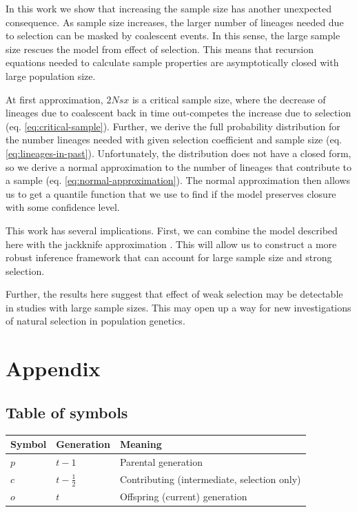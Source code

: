\documentclass[review]{elsarticle}
\begin{document}
In this work we show that increasing the sample size has another unexpected consequence. As sample
size increases, the larger number of lineages needed due to selection can be masked by coalescent
events. In this sense, the large sample size rescues the model from effect of selection. This means
that recursion equations needed to calculate sample properties are asymptotically closed with large
population size.

At first approximation, $2Nsx$ is a critical sample size, where the decrease of lineages due to
coalescent back in time out-competes the increase due to selection (eq. \eqref{eq:critical-sample}).
Further, we derive the full probability distribution for the number lineages needed with given
selection coefficient and sample size (eq. \eqref{eq:lineages-in-past}). Unfortunately, the
distribution does not have a closed form, so we derive a normal approximation to the number of
lineages that contribute to a sample (eq. \eqref{eq:normal-approximation}). The normal approximation
then allows us to get a quantile function that we use to find if the model preserves closure with
some confidence level.

This work has several implications. First, we can combine the model described here with the
jackknife approximation \citep{JouganousEtAl2017}. This will allow us to construct a more robust
inference framework that can account for large sample size and strong selection.

Further, the results here suggest that effect of weak selection may be detectable in studies with
large sample sizes. This may open up a way for new investigations of natural selection in population
genetics.



\section{Appendix}
\subsection{Table of symbols}

\label{ssec:tab-symbols}
\begin{center}
\begin{tabular}{lll}
Symbol & Generation & Meaning\\
\hline
$p$ & $t-1$ & Parental generation\\
$c$ & $t-\frac{1}{2}$ & Contributing (intermediate, selection only)\\
$o$ & $t$ & Offspring (current) generation\\
\end{tabular}
\end{center}
\end{document}

